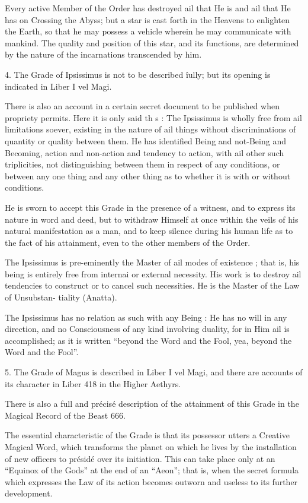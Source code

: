 Every active Member of the Order has destroyed ail that He is and ail that He has on Crossing the Abyss; but a star is cast forth in the Heavens to enlighten the Earth, so that he may possess a vehicle wherein he may communicate with mankind. The quality and position of this star, and its functions, are determined by the nature of the incarnations transcended by him.

4. The Grade of Ipsissimus is not to be described îully; but its opening is indicated in Liber I vel Magi.

There is also an account in a certain secret document to be
published when propriety permits. Here it is only said th s : The Ipsissimus is wholly free from ail limitations soever, existing in the nature of ail things without discriminations of quantity or quality between them. He has identified Being and not-Being and Becoming, action and non-action and tendency to action, with ail other such triplicities, not distinguishing between them in respect of any conditions, or between any one thing and any other thing as to whether it is with or without conditions.

He is sworn to accept this Grade in the presence of a witness, and to express its nature in word and deed, but to withdraw Himself at once within the veils of his natural manifestation as a man, and to keep silence during his human life as to the fact of his attainment, even to the other members of the Order.

The Ipsissimus is pre-eminently the Master of ail modes of existence ; that is, his being is entirely free from internai or external necessity. His work is to destroy ail tendencies to construct or to cancel such necessities. He is the Master of the Law of Unsubstan- tiality (Anatta).

The Ipsissimus has no relation as such with any Being : He has no will in any direction, and no Consciousness of any kind involving duality, for in Him ail is accomplished; as it is written “beyond the Word and the Fool, yea, beyond the Word and the Fool”.

5. The Grade of Magus is described in Liber I vel Magi, and there are accounts of its character in Liber 418 in the Higher Aethyrs.

There is also a full and précisé description of the attainment of this Grade in the Magical Record of the Beast 666.

The essential characteristic of the Grade is that its possessor utters a Creative Magical Word, which transforms the planet on which he lives by the installation of new officers to présidé over its initiation. This can take place only at an “Equinox of the Gods” at the end of an “Aeon”; that is, when the secret formula which expresses the Law of its action becomes outworn and useless to its further development.

